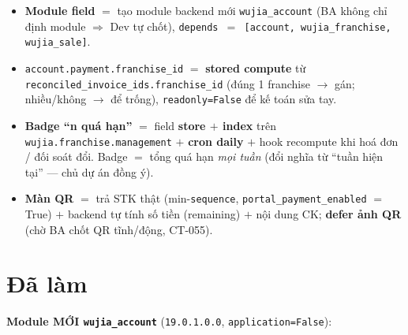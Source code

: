 \begin{itemize}
  \item \textbf{Module field} $=$ tạo module backend mới \texttt{wujia\_account} (BA không chỉ
    định module $\Rightarrow$ Dev tự chốt), \texttt{depends $=$ [account, wujia\_franchise,
    wujia\_sale]}.
  \item \texttt{account.payment.franchise\_id} $=$ \textbf{stored compute} từ
    \texttt{reconciled\_invoice\_ids.franchise\_id} (đúng 1 franchise $\to$ gán; nhiều/không
    $\to$ để trống), \texttt{readonly=False} để kế toán sửa tay.
  \item \textbf{Badge ``n quá hạn''} $=$ field \textbf{store $+$ index} trên
    \texttt{wujia.franchise.management} $+$ \textbf{cron daily} $+$ hook recompute khi hoá đơn /
    đối soát đổi. Badge $=$ tổng quá hạn \emph{mọi tuần} (đổi nghĩa từ ``tuần hiện tại'' ---
    chủ dự án đồng ý).
  \item \textbf{Màn QR} $=$ trả STK thật (min-\texttt{sequence}, \texttt{portal\_payment\_enabled}
    $=$ True) $+$ backend tự tính số tiền (remaining) $+$ nội dung CK; \textbf{defer ảnh QR}
    (chờ BA chốt QR tĩnh/động, CT-055).
\end{itemize}

\section{Đã làm}

\textbf{Module MỚI \texttt{wujia\_account}} (\texttt{19.0.1.0.0}, \texttt{application=False}):

